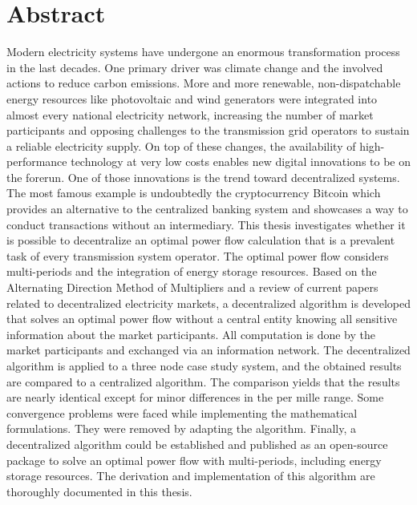\section*{Abstract}

Modern electricity systems have undergone an enormous transformation process in the last decades. One primary driver was climate change and the involved actions to reduce carbon emissions. More and more renewable, non-dispatchable energy resources like photovoltaic and wind generators were integrated into almost every national electricity network, increasing the number of market participants and opposing challenges to the transmission grid operators to sustain a reliable electricity supply. On top of these changes, the availability of high-performance technology at very low costs enables new digital innovations to be on the forerun. One of those innovations is the trend toward decentralized systems. The most famous example is undoubtedly the cryptocurrency Bitcoin which provides an alternative to the centralized banking system and showcases a way to conduct transactions without an intermediary. This thesis investigates whether it is possible to decentralize an optimal power flow calculation that is a prevalent task of every transmission system operator. The optimal power flow considers multi-periods and the integration of energy storage resources. Based on the Alternating Direction Method of Multipliers and a review of current papers related to decentralized electricity markets, a decentralized algorithm is developed that solves an optimal power flow without a central entity knowing all sensitive information about the market participants. All computation is done by the market participants and exchanged via an information network. The decentralized algorithm is applied to a three node case study system, and the obtained results are compared to a centralized algorithm. The comparison yields that the results are nearly identical except for minor differences in the per mille range. Some convergence problems were faced while implementing the mathematical formulations. They were removed by adapting the algorithm. Finally, a decentralized algorithm could be established and published as an open-source package to solve an optimal power flow with multi-periods, including energy storage resources. The derivation and implementation of this algorithm are thoroughly documented in this thesis.